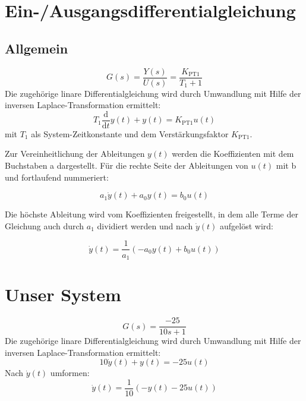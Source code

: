 \section{Ein-/Ausgangsdifferentialgleichung}
\subsection*{Allgemein}
\begin{equation*}
  G(s) = \frac{Y(s)}{U(s)} = \frac{K_\text{PT1}}{T_1+1}
\end{equation*}
Die zugehörige linare Differentialgleichung wird durch Umwandlung mit Hilfe der inversen Laplace-Transformation ermittelt:
\begin{equation*}
  T_1\frac{\mathrm d}{\mathrm dt}y(t)+y(t)=K_\text{PT1}u(t)
\end{equation*}
mit $T_1$ als System-Zeitkonstante und dem Verstärkungsfaktor $K_\text{PT1}$.

Zur Vereinheitlichung der Ableitungen $y(t)$ werden die Koeffizienten mit dem Buchstaben a dargestellt.
Für die rechte Seite der Ableitungen von $u(t)$ mit b und fortlaufend nummeriert:

\begin{equation*}
  a_1\dot y(t)+a_0y(t) = b_0u(t)
\end{equation*}

Die höchste Ableitung wird vom Koeffizienten freigestellt, in dem alle Terme der Gleichung auch durch $a_1$ dividiert werden und nach $\dot y(t)$ aufgelöst wird:

\begin{equation*}
  \dot y(t)= \frac{1}{a_1}(-a_0y(t) +b_0u(t))
\end{equation*}

\section*{Unser System}
\begin{equation*}
  G(s)=\frac{-25}{10s+1}
\end{equation*}
Die zugehörige linare Differentialgleichung wird durch Umwandlung mit Hilfe der inversen Laplace-Transformation ermittelt:
\begin{equation*}
  10\dot y(t)+y(t)= -25u(t)
\end{equation*}
Nach $\dot y(t)$ umformen:
\begin{equation*}
  \dot y(t)= \frac{1}{10}(-y(t)-25u(t))
\end{equation*}